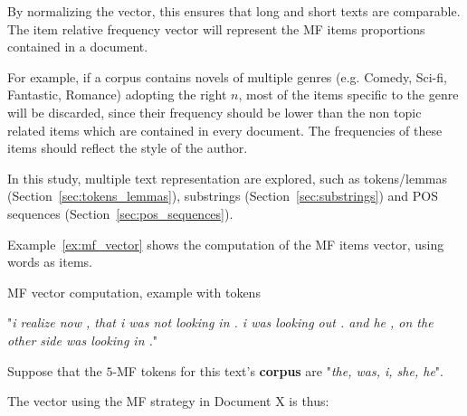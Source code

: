By normalizing the vector, this ensures that long and short texts are comparable.
The item relative frequency vector will represent the MF items proportions contained in a document.

For example, if a corpus contains novels of multiple genres (e.g. Comedy, Sci-fi, Fantastic, Romance) adopting the right $n$, most of the items specific to the genre will be discarded, since their frequency should be lower than the non topic related items which are contained in every document.
The frequencies of these items should reflect the style of the author.

In this study, multiple text representation are explored, such as tokens/lemmas (Section~\ref{sec:tokens_lemmas}), substrings (Section~\ref{sec:substrings}) and POS sequences (Section~\ref{sec:pos_sequences}).

Example~\ref{ex:mf_vector} shows the computation of the MF items vector, using words as items.

\begin{example}
  \centering
  \caption{MF vector computation, example with tokens}
  \label{ex:mf_vector}

  \begin{subexample}{\linewidth}
    "\textit{i realize now , that i was not looking in . i was looking out . and he , on the other side was looking in .}"\cite{ddlc}
  \end{subexample}

  \vspace{0.5cm}

  \begin{subexample}{\linewidth}
    Suppose that the $5$-MF tokens for this text's \textbf{corpus} are "\textit{the, was, i, she, he}".

    The vector using the MF strategy in Document X is thus:
    \vspace{0.2cm}

    \centering
  \end{subexample}
\end{example}

